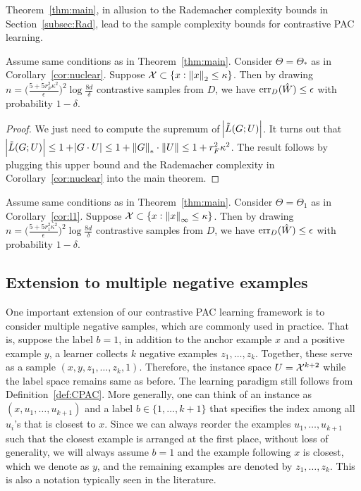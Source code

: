 Theorem~\ref{thm:main}, in allusion to the Rademacher complexity bounds in Section~\ref{subsec:Rad}, lead to the sample complexity bounds for contrastive PAC learning. 

\begin{corollary}
Assume same conditions as in Theorem~\ref{thm:main}. Consider $\Theta = \Theta_*$ as in Corollary~\ref{cor:nuclear}. Suppose $\mathcal{X} \subset \{x: \left\lVert x \right\rVert_{2} \leq \kappa \}$. Then by drawing $n = \big( \frac{5 + 5 r_F^2 \kappa^2}{\epsilon} \big)^2 \log\frac{8d}{\delta} $ contrastive samples from $D$, we have $\mathrm{err}_D(\hat{W}) \leq \epsilon$ with probability $1-\delta$.
\end{corollary}
\begin{proof}
We just need to compute the supremum of $\abs{ \tilde{L}(G; U)}$. It turns out that $\abs{ \tilde{L}(G; U)} \leq 1 + \abs{G \cdot U} \leq 1 + \left\lVert G \right\rVert_{*} \cdot \left\lVert U \right\rVert \leq 1 + r_F^2 \kappa^2$. The result follows by plugging this upper bound and the Rademacher complexity in Corollary~\ref{cor:nuclear} into the main theorem.
\end{proof}


\begin{corollary}
Assume same conditions as in Theorem~\ref{thm:main}. Consider $\Theta = \Theta_1$ as in Corollary~\ref{cor:l1}. Suppose $\mathcal{X} \subset \{x: \left\lVert x \right\rVert_{\infty} \leq \kappa \}$. Then by drawing $n = \big( \frac{5 + 5 r_1^2 \kappa^2}{\epsilon} \big)^2 \log\frac{8d}{\delta} $ contrastive samples from $D$, we have $\mathrm{err}_D(\hat{W}) \leq \epsilon$ with probability $1-\delta$.
\end{corollary}

\subsection{Extension to multiple negative examples}

One important extension of our contrastive PAC learning framework is to consider multiple negative samples, which are commonly used in practice. That is, suppose the label $b=1$, in addition to the anchor example $x$ and a positive example $y$, a learner collects $k$ negative examples $z_1, \dots, z_k$. Together, these serve as a sample $(x, y, z_1, \dots, z_k, 1)$. Therefore, the instance space $U = \mathcal{X}^{k+2}$ while the label space remains same as before. The learning paradigm still follows from Definition~\ref{def:CPAC}. More generally, one can think of an instance as $(x, u_1, \dots, u_{k+1})$ and a label $b \in \{1, \dots, k+1\}$ that specifies the index among all $u_i$'s that is closest to $x$. Since we can always reorder the examples $u_1, \dots, u_{k+1}$ such that the closest example is arranged at the first place, without loss of generality, we will always assume $b = 1$ and the example following $x$ is closest, which we denote as $y$, and the remaining examples are denoted by $z_1, \dots, z_k$. This is also a notation typically seen in the literature.

